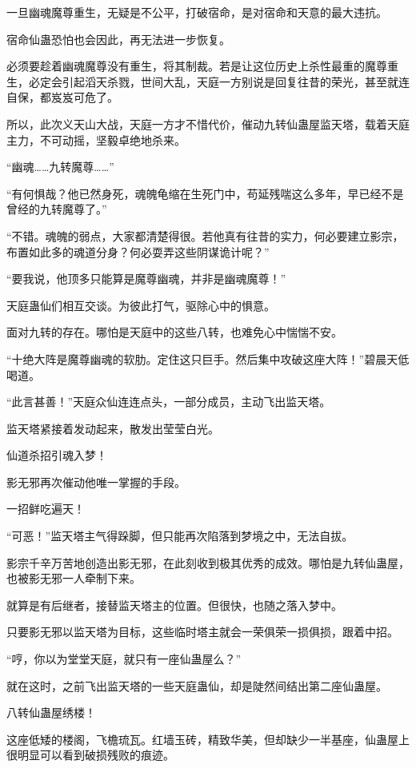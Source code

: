 \begin{this_body}
一旦幽魂魔尊重生，无疑是不公平，打破宿命，是对宿命和天意的最大违抗。

宿命仙蛊恐怕也会因此，再无法进一步恢复。

必须要趁着幽魂魔尊没有重生，将其制裁。若是让这位历史上杀性最重的魔尊重生，必定会引起滔天杀戮，世间大乱，天庭一方别说是回复往昔的荣光，甚至就连自保，都岌岌可危了。

所以，此次义天山大战，天庭一方才不惜代价，催动九转仙蛊屋监天塔，载着天庭主力，不可动摇，坚毅卓绝地杀来。

“幽魂……九转魔尊……”

“有何惧哉？他已然身死，魂魄龟缩在生死门中，苟延残喘这么多年，早已经不是曾经的九转魔尊了。”

“不错。魂魄的弱点，大家都清楚得很。若他真有往昔的实力，何必要建立影宗，布置如此多的魂道分身？何必耍弄这些阴谋诡计呢？”

“要我说，他顶多只能算是魔尊幽魂，并非是幽魂魔尊！”

天庭蛊仙们相互交谈。为彼此打气，驱除心中的惧意。

面对九转的存在。哪怕是天庭中的这些八转，也难免心中惴惴不安。

“十绝大阵是魔尊幽魂的软肋。定住这只巨手。然后集中攻破这座大阵！”碧晨天低喝道。

“此言甚善！”天庭众仙连连点头，一部分成员，主动飞出监天塔。

监天塔紧接着发动起来，散发出莹莹白光。

仙道杀招引魂入梦！

影无邪再次催动他唯一掌握的手段。

一招鲜吃遍天！

“可恶！”监天塔主气得跺脚，但只能再次陷落到梦境之中，无法自拔。

影宗千辛万苦地创造出影无邪，在此刻收到极其优秀的成效。哪怕是九转仙蛊屋，也被影无邪一人牵制下来。

就算是有后继者，接替监天塔主的位置。但很快，也随之落入梦中。

只要影无邪以监天塔为目标，这些临时塔主就会一荣俱荣一损俱损，跟着中招。

“哼，你以为堂堂天庭，就只有一座仙蛊屋么？”

就在这时，之前飞出监天塔的一些天庭蛊仙，却是陡然间结出第二座仙蛊屋。

八转仙蛊屋绣楼！

这座低矮的楼阁，飞檐琉瓦。红墙玉砖，精致华美，但却缺少一半基座，仙蛊屋上很明显可以看到破损残败的痕迹。


\end{this_body}
